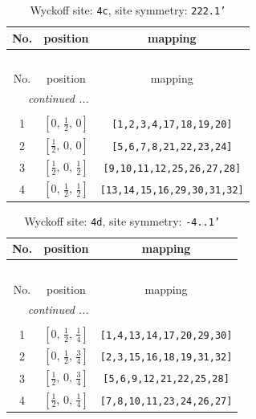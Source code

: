 \documentclass[fleqn,8pt]{jsarticle}
\begin{document}
\renewcommand{\arraystretch}{1.2}
\begin{longtable}{ccc}
\caption{Wyckoff site: {\tt 4c}, site symmetry: {\tt 222.1'}}
 \\
 \hline \hline
No. & position & mapping \\ \hline \endfirsthead

\multicolumn{2}{l}{\tablename\ \thetable{}} \\
 \hline \hline
No. & position & mapping \\ \hline \endhead

 \hline \hline
\multicolumn{2}{r}{\footnotesize\it continued ...} \\ \endfoot

 \hline \hline
\multicolumn{2}{r}{} \\ \endlastfoot

1 & $\left[ 0,\, \frac{1}{2},\, 0 \right]$ & {\tt [1,2,3,4,17,18,19,20]} \\ \hline
2 & $\left[ \frac{1}{2},\, 0,\, 0 \right]$ & {\tt [5,6,7,8,21,22,23,24]} \\ \hline
3 & $\left[ \frac{1}{2},\, 0,\, \frac{1}{2} \right]$ & {\tt [9,10,11,12,25,26,27,28]} \\ \hline
4 & $\left[ 0,\, \frac{1}{2},\, \frac{1}{2} \right]$ & {\tt [13,14,15,16,29,30,31,32]} \\
\end{longtable}
\renewcommand{\arraystretch}{1.2}
\begin{longtable}{ccc}
\caption{Wyckoff site: {\tt 4d}, site symmetry: {\tt -4..1'}}
 \\
 \hline \hline
No. & position & mapping \\ \hline \endfirsthead

\multicolumn{2}{l}{\tablename\ \thetable{}} \\
 \hline \hline
No. & position & mapping \\ \hline \endhead

 \hline \hline
\multicolumn{2}{r}{\footnotesize\it continued ...} \\ \endfoot

 \hline \hline
\multicolumn{2}{r}{} \\ \endlastfoot

1 & $\left[ 0,\, \frac{1}{2},\, \frac{1}{4} \right]$ & {\tt [1,4,13,14,17,20,29,30]} \\ \hline
2 & $\left[ 0,\, \frac{1}{2},\, \frac{3}{4} \right]$ & {\tt [2,3,15,16,18,19,31,32]} \\ \hline
3 & $\left[ \frac{1}{2},\, 0,\, \frac{3}{4} \right]$ & {\tt [5,6,9,12,21,22,25,28]} \\ \hline
4 & $\left[ \frac{1}{2},\, 0,\, \frac{1}{4} \right]$ & {\tt [7,8,10,11,23,24,26,27]} \\
\end{longtable}
\end{document}
